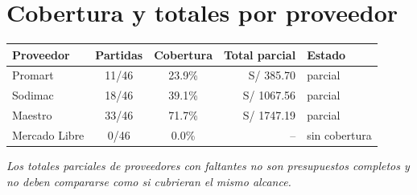 \documentclass[11pt,a4paper]{article}
\begin{document}
\section{Cobertura y totales por proveedor}
\begin{tabular}{lccrl}
\toprule Proveedor & Partidas & Cobertura & Total parcial & Estado \\ \midrule
Promart & 11/46 & 23.9\% & S/ 385.70 & parcial \\
Sodimac & 18/46 & 39.1\% & S/ 1067.56 & parcial \\
Maestro & 33/46 & 71.7\% & S/ 1747.19 & parcial \\
Mercado Libre & 0/46 & 0.0\% & -- & sin cobertura \\
\bottomrule
\end{tabular}

\textit{Los totales parciales de proveedores con faltantes no son presupuestos completos y no deben compararse como si cubrieran el mismo alcance.}
\end{document}
